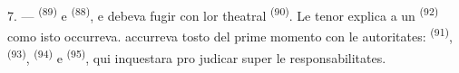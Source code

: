 7. ---  \textsuperscript{(89)} e 
\textsuperscript{(88)},  e  debeva fugir
con lor  theatral \textsuperscript{(90)}. Le tenor explica a un
 \textsuperscript{(92)} como isto occurreva.  accurreva tosto del prime momento con le autoritates:
 \textsuperscript{(91)}, 
\textsuperscript{(93)},  \textsuperscript{(94)} e
 \textsuperscript{(95)}, qui inquestara pro judicar
super le responsabilitates.
\VUsaut{6.0mm}
\VUfilet{22mm}
